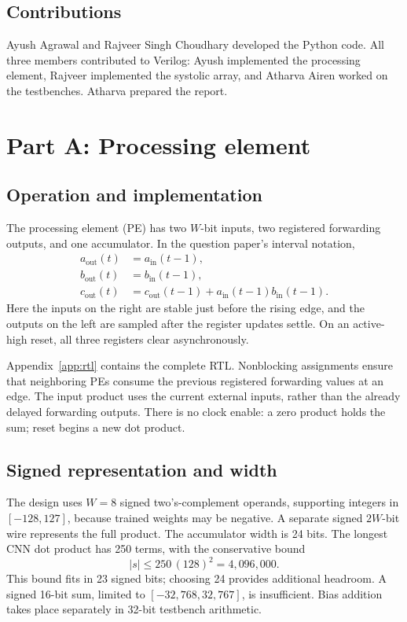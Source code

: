 \documentclass[10pt,twocolumn,letterpaper]{article}
\begin{document}
\subsection*{Contributions}
Ayush Agrawal and Rajveer Singh Choudhary developed the Python code.
All three members contributed to Verilog: Ayush implemented the processing
element, Rajveer implemented the systolic array, and Atharva Airen worked on
the testbenches. Atharva prepared the report.

\section{Part A: Processing element}
\subsection{Operation and implementation}
The processing element (PE) has two $W$-bit inputs, two registered forwarding
outputs, and one accumulator. In the question paper's interval notation,
\begin{align}
a_{\mathrm{out}}(t)&=a_{\mathrm{in}}(t-1),\\
b_{\mathrm{out}}(t)&=b_{\mathrm{in}}(t-1),\\
c_{\mathrm{out}}(t)&=c_{\mathrm{out}}(t-1)
 +a_{\mathrm{in}}(t-1)b_{\mathrm{in}}(t-1).
\end{align}
Here the inputs on the right are stable just before the rising edge, and the
outputs on the left are sampled after the register updates settle. On an
active-high reset, all three registers clear asynchronously.

Appendix~\ref{app:rtl} contains the complete RTL. Nonblocking
assignments ensure that neighboring PEs consume the previous registered
forwarding values at an edge. The input product uses the current external
inputs, rather than the already delayed forwarding outputs. There is no
clock enable: a zero product holds the sum; reset begins a new dot product.

\subsection{Signed representation and width}
The design uses $W=8$ signed two's-complement operands, supporting integers
in $[-128,127]$, because trained weights may be negative. A separate signed
$2W$-bit wire represents the full product. The accumulator width is 24 bits.
The longest CNN dot product has 250 terms, with the conservative bound
\begin{equation}
|s|\leq250\,(128)^2=4{,}096{,}000.
\end{equation}
This bound fits in 23 signed bits; choosing 24 provides additional headroom.
A signed 16-bit sum, limited to $[-32{,}768,32{,}767]$, is insufficient.
Bias addition takes place separately in 32-bit testbench arithmetic.
\end{document}
